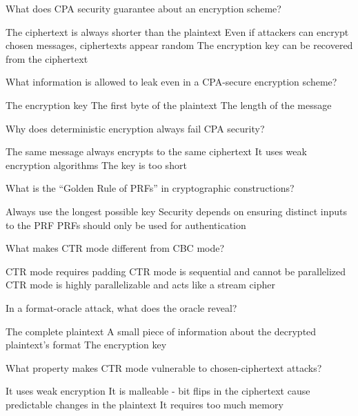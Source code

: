 \documentclass[10pt,a4paper,american]{exam}
\begin{document}
\begin{questions}
	\question What does CPA security guarantee about an encryption scheme?
	\begin{randomizechoices}
		\choice The ciphertext is always shorter than the plaintext
		\CorrectChoice Even if attackers can encrypt chosen messages, ciphertexts appear random
		\choice The encryption key can be recovered from the ciphertext
	\end{randomizechoices}

	\question What information is allowed to leak even in a CPA-secure encryption scheme?
	\begin{randomizechoices}
		\choice The encryption key
		\choice The first byte of the plaintext
		\CorrectChoice The length of the message
	\end{randomizechoices}

	\question Why does deterministic encryption always fail CPA security?
	\begin{randomizechoices}
		\CorrectChoice The same message always encrypts to the same ciphertext
		\choice It uses weak encryption algorithms
		\choice The key is too short
	\end{randomizechoices}

	\question What is the ``Golden Rule of PRFs'' in cryptographic constructions?
	\begin{randomizechoices}
		\choice Always use the longest possible key
		\CorrectChoice Security depends on ensuring distinct inputs to the PRF
		\choice PRFs should only be used for authentication
	\end{randomizechoices}

	\question What makes CTR mode different from CBC mode?
	\begin{randomizechoices}
		\choice CTR mode requires padding
		\choice CTR mode is sequential and cannot be parallelized
		\CorrectChoice CTR mode is highly parallelizable and acts like a stream cipher
	\end{randomizechoices}

	\question In a format-oracle attack, what does the oracle reveal?
	\begin{randomizechoices}
		\choice The complete plaintext
		\CorrectChoice A small piece of information about the decrypted plaintext's format
		\choice The encryption key
	\end{randomizechoices}

	\question What property makes CTR mode vulnerable to chosen-ciphertext attacks?
	\begin{randomizechoices}
		\choice It uses weak encryption
		\CorrectChoice It is malleable - bit flips in the ciphertext cause predictable changes in the plaintext
		\choice It requires too much memory
	\end{randomizechoices}


\end{questions}
\end{document}
